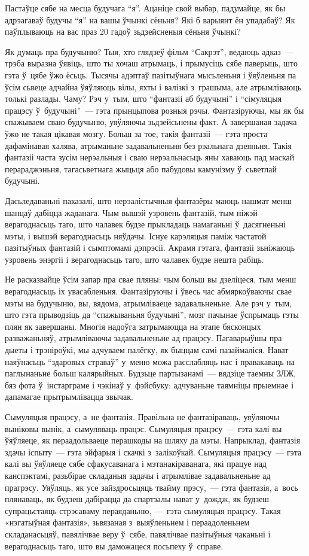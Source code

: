 Пастаўце сябе на месца будучага ``я''. Ацаніце свой выбар, падумайце, як бы адрэагаваў будучы ``я'' на вашы ўчынкі сёньня? Які б варыянт ён упадабаў? Як паўплываюць на вас праз 20 гадоў зьдзейсненыя сёньня ўчынкі?

Як думаць пра будучыню? Тыя, хто глядзеў фільм ``Сакрэт'', ведаюць адказ~--- трэба выразна ўявіць, што ты хочаш атрымаць, і прымусіць сябе паверыць, што гэта ў~цябе ўжо ёсьць. Тысячы адэптаў пазітыўнага мысьленьня і ўяўленьня па ўсім сьвеце адчайна ўяўляюць вілы, яхты і валізкі з~грашыма, але атрымліваюць толькі разлады. Чаму? Рэч у~тым, што ``фантазіі аб будучыні'' і ``сімуляцыя працэсу ў~будучыні''~--- гэта прынцыпова розныя рэчы. Фантазіруючы, мы як бы спажываем сваю будучыню, уяўляючы зьдзейсьнены факт. А завершаная задача ўжо не такая цікавая мозгу. Больш за тое, такія фантазіі~--- гэта проста дафамінавая халява, атрыманьне задавальненьня без рэальнага дзеяньня. Такія фантазіі часта зусім нерэальныя і сваю нерэальнасьць яны хаваюць пад маскай перараджэньня, тагасьветнага жыцьця або пабудовы камунізму ў~сьветлай будучыні.

Дасьледаваньні паказалі, што нерэалістычныя фантазёры маюць нашмат менш шанцаў дабіцца жаданага. Чым вышэй узровень фантазій, тым ніжэй верагоднасьць таго, што чалавек будзе прыкладаць намаганьні ў~дасягненьні мэты, і вышэй верагоднасьць няўдачы. Існуе карэляцыя паміж частатой пазітыўных фантазій і сымптомамі дэпрэсіі. Акрамя гэтага, фантазіі зьніжаюць узровень энэргіі і верагоднасьць таго, што чалавек будзе нешта рабіць.

Не расказвайце ўсім запар пра свае пляны: чым больш вы дзеліцеся, тым менш верагоднасьць іх увасабленьня. Фантазіруючы і ўвесь час абмяркоўваючы свае мэты на будучыню, вы, вядома, атрымліваеце задавальненьне. Але рэч у~тым, што гэта прыводзіць да ``спажываньня будучыні'', мозг пачынае ўспрымаць гэты плян як завершаны. Многія надоўга затрымаюцца на этапе бясконцых разважаньняў, атрымліваючы задавальненьне ад працэсу. Пагаварыўшы пра дыеты і трэніроўкі, мы адчуваем палёгку, як быццам самі пазаймаліся. Нават наяўнасьць ``здаровых страваў'' у~меню можа расслабляць нас і правакаваць на паглынаньне больш калярыйных. Будзьце партызанамі~--- вядзіце таемны ЗЛЖ, бяз фота ў~інстарграме і чэкінаў у~фэйсбуку: адчуваньне таямніцы прыемнае і дапамагае прытрымлівацца звычак.

Сымуляцыя працэсу, а~не фантазія. Правільна не фантазіраваць, уяўляючы выніковы вынік, а~сымуляваць працэс. Сымуляцыя працэсу~--- гэта калі вы ўяўляеце, як пераадольваеце перашкоды на шляху да мэты. Напрыклад, фантазія здачы іспыту~--- гэта эйфарыя і скачкі з~залікоўкай. Сымуляцыя працэсу~--- гэта калі вы ўяўляеце сябе сфакусаванага і мэтанакіраванага, які працуе над канспэктамі, разьбірае складаныя задачы і атрымлівае задавальненьне ад прагрэсу. Уяўляць, як усе зайздросьцяць твайму прэсу,~--- гэта фантазія, а~вось плянаваць, як будзеш дабірацца да спартзалы нават у~дождж, як будзеш супрацьстаяць стрэсаваму пераяданьню,~--- гэта сымуляцыя працэсу. Такая «нэгатыўная фантазія», зьвязаная з~выяўленьнем і пераадоленьнем складанасьцяў, павялічвае веру ў~сябе, павялічвае пазітыўныя чаканьні і верагоднасьць таго, што вы даможацеся посьпеху ў~справе.

